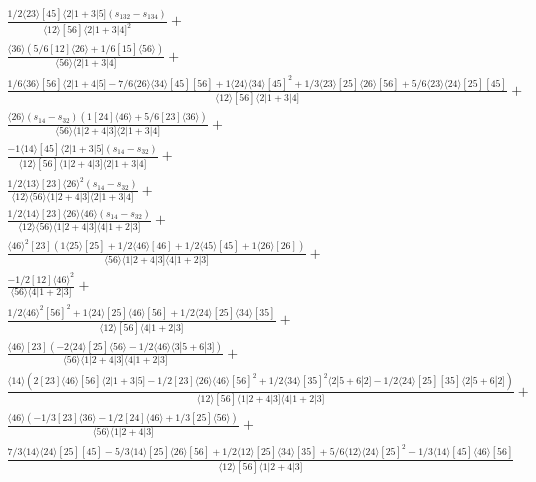 \documentclass[varwidth, border=5pt]{standalone}
\begin{document}
\begin{my}
$\begin{gathered}
\scriptscriptstyle\frac{1/2⟨23⟩[45]⟨2|1+3|5](s_{132}-s_{134})}{⟨12⟩[56]⟨2|1+3|4]^2}+\\
\scriptscriptstyle\frac{⟨36⟩(5/6[12]⟨26⟩+1/6[15]⟨56⟩)}{⟨56⟩⟨2|1+3|4]}+\\
\scriptscriptstyle\frac{1/6⟨36⟩[56]⟨2|1+4|5]-7/6⟨26⟩⟨34⟩[45][56]+1⟨24⟩⟨34⟩[45]^2+1/3⟨23⟩[25]⟨26⟩[56]+5/6⟨23⟩⟨24⟩[25][45]}{⟨12⟩[56]⟨2|1+3|4]}+\\
\scriptscriptstyle\frac{⟨26⟩(s_{14}-s_{32})(1[24]⟨46⟩+5/6[23]⟨36⟩)}{⟨56⟩⟨1|2+4|3]⟨2|1+3|4]}+\\
\scriptscriptstyle\frac{-1⟨14⟩[45]⟨2|1+3|5](s_{14}-s_{32})}{⟨12⟩[56]⟨1|2+4|3]⟨2|1+3|4]}+\\
\scriptscriptstyle\frac{1/2⟨13⟩[23]⟨26⟩^2(s_{14}-s_{32})}{⟨12⟩⟨56⟩⟨1|2+4|3]⟨2|1+3|4]}+\\
\scriptscriptstyle\frac{1/2⟨14⟩[23]⟨26⟩⟨46⟩(s_{14}-s_{32})}{⟨12⟩⟨56⟩⟨1|2+4|3]⟨4|1+2|3]}+\\
\scriptscriptstyle\frac{⟨46⟩^2[23](1⟨25⟩[25]+1/2⟨46⟩[46]+1/2⟨45⟩[45]+1⟨26⟩[26])}{⟨56⟩⟨1|2+4|3]⟨4|1+2|3]}+\\
\scriptscriptstyle\frac{-1/2[12]⟨46⟩^2}{⟨56⟩⟨4|1+2|3]}+\\
\scriptscriptstyle\frac{1/2⟨46⟩^2[56]^2+1⟨24⟩[25]⟨46⟩[56]+1/2⟨24⟩[25]⟨34⟩[35]}{⟨12⟩[56]⟨4|1+2|3]}+\\
\scriptscriptstyle\frac{⟨46⟩[23](-2⟨24⟩[25]⟨56⟩-1/2⟨46⟩⟨3|5+6|3])}{⟨56⟩⟨1|2+4|3]⟨4|1+2|3]}+\\
\scriptscriptstyle\frac{⟨14⟩(2[23]⟨46⟩[56]⟨2|1+3|5]-1/2[23]⟨26⟩⟨46⟩[56]^2+1/2⟨34⟩[35]^2⟨2|5+6|2]-1/2⟨24⟩[25][35]⟨2|5+6|2])}{⟨12⟩[56]⟨1|2+4|3]⟨4|1+2|3]}+\\
\scriptscriptstyle\frac{⟨46⟩(-1/3[23]⟨36⟩-1/2[24]⟨46⟩+1/3[25]⟨56⟩)}{⟨56⟩⟨1|2+4|3]}+\\
\scriptscriptstyle\frac{7/3⟨14⟩⟨24⟩[25][45]-5/3⟨14⟩[25]⟨26⟩[56]+1/2⟨12⟩[25]⟨34⟩[35]+5/6⟨12⟩⟨24⟩[25]^2-1/3⟨14⟩[45]⟨46⟩[56]}{⟨12⟩[56]⟨1|2+4|3]}\phantom{+}
\end{gathered}$
\end{my}
\end{document}
